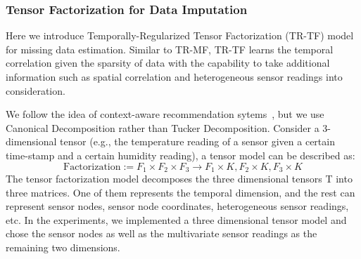 \subsubsection{Tensor Factorization for Data Imputation} \label{sec:tfmissing}


Here we introduce Temporally-Regularized Tensor Factorization (TR-TF) model for missing data estimation. 
Similar to TR-MF, TR-TF learns the temporal correlation given the sparsity of data with the capability to take additional information such as spatial correlation and heterogeneous sensor readings into consideration.

We follow the idea of context-aware recommendation sytems~\cite{karatzoglou2010multiverse}, but we use Canonical Decomposition rather than Tucker Decomposition.
Consider a 3-dimensional tensor (e.g., the temperature reading of a sensor given a certain time-stamp and a certain humidity reading), a tensor model can be described as:
\begin{equation*}
\mbox{Factorization} :=  F_1 \times  F_2 \times F_3 \rightarrow F_1 \times K, F_2 \times K, F_3 \times K
\end{equation*}
The tensor factorization model decomposes the three dimensional tensors T into three matrices. One of them represents the temporal dimension, and the rest can represent sensor nodes, sensor node coordinates, heterogeneous sensor readings, etc. In the experiments, we implemented a three dimensional tensor model and chose the sensor nodes as well as the multivariate sensor readings as the remaining two dimensions.

